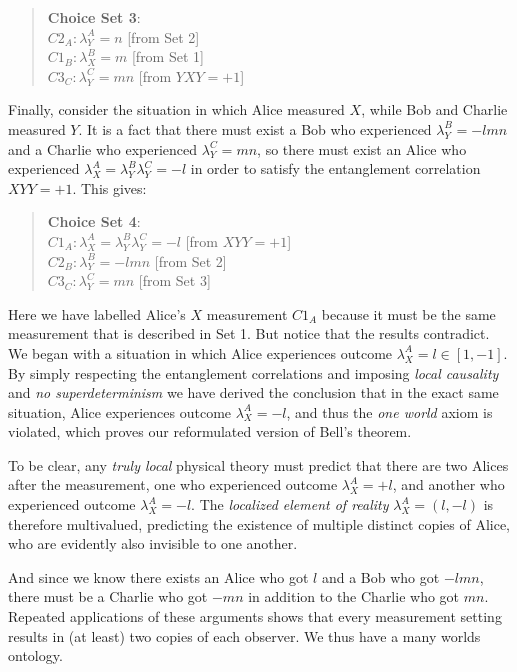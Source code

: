 \documentclass[a4paper]{article}
\begin{document}
\begin{quote}
\textbf{Choice Set 3}:\\
$C2_A: \lambda_Y^A = n$ [from Set 2]\\
$C1_B: \lambda_X^B = m$ [from Set 1]\\ 
$C3_C: \lambda_Y^C = mn$ [from $YXY=+1$]
\end{quote}

Finally, consider the situation in which Alice measured $X$, while Bob and Charlie measured $Y$.  It is a fact that there must exist a Bob who experienced $\lambda_Y^B = -lmn$ and a Charlie who experienced $\lambda_Y^C = mn$, so there must exist an Alice who experienced $\lambda_X^A = \lambda_Y^B\lambda_Y^C = -l$ in order to satisfy the entanglement correlation $XYY = +1$. This gives:

\begin{quote}
\textbf{Choice Set 4}:\\
$C1_A: \lambda_X^A = \lambda_Y^B\lambda_Y^C = -l$ [from $XYY=+1$]\\
$C2_B: \lambda_Y^B = -lmn$ [from Set 2]\\ 
$C3_C: \lambda_Y^C = mn$ [from Set 3]
\end{quote}

Here we have labelled Alice's $X$ measurement $C1_A$ because it must be the same measurement that is described in Set 1. But notice that the results contradict. We began with a situation in which Alice experiences outcome $\lambda_X^A = l \in [1,-1]$. By simply respecting the entanglement correlations and imposing \textit{local causality} and \textit{no superdeterminism} we have derived the conclusion that in the exact same situation, Alice experiences outcome $\lambda_X^A = -l$, and thus the \textit{one world} axiom is violated, which proves our reformulated version of Bell's theorem.

To be clear, any \textit{truly local} physical theory must predict that there are two Alices after the measurement, one who experienced outcome $\lambda_X^A = +l$, and another who experienced outcome $\lambda_X^A = -l$. The \textit{localized element of reality} $\lambda_X^A = (l,-l)$ is therefore multivalued, predicting the existence of multiple distinct copies of Alice, who are evidently also invisible to one another.

And since we know there exists an Alice who got $l$ and a Bob who got $-lmn$, there must be a Charlie who got $-mn$ in addition to the Charlie who got $mn$. Repeated applications of these arguments shows that every measurement setting results in (at least) two copies of each observer. We thus have a many worlds ontology.
\end{document}
